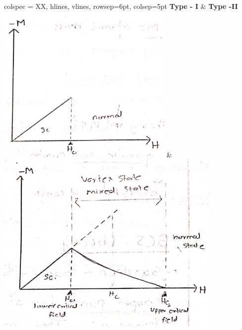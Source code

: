 \documentclass[12pt, a4paper]{article}
\begin{document}
\begin{longtblr}{
		colspec = {XX},
		hlines,
		vlines,
		rowsep=6pt,
		colsep=5pt
	}
	\Large\textbf{Type - I}                                                                            &  \Large\textbf{Type -II}                                                                                                            \\
	\includegraphics[max width=\linewidth]{type1}                                                                 & \includegraphics[max width=\linewidth]{type2}                                                                                                  \\

\end{longtblr}
\end{document}
